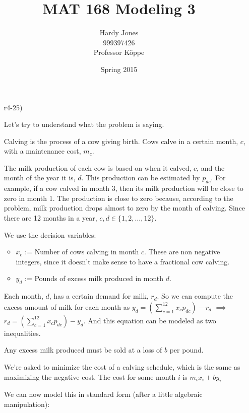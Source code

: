 \documentclass[12pt,letterpaper]{article}
\title{MAT 168 Modeling 3\vspace{-2ex}}
\author{Hardy Jones\\
        999397426\\
        Professor K\"{o}ppe\vspace{-2ex}}
\date{Spring 2015}
\begin{document}
  \maketitle

  \begin{enumerate}
    \item [r4-25)]

      Let's try to understand what the problem is saying.

      Calving is the process of a cow giving birth.
      Cows calve in a certain month, $c$,
      with a maintenance cost, $m_c$.

      The milk production of each cow is based on when it calved, $c$, and the month of the year it is, $d$.
      This production can be estimated by $p_{dc}$.
      For example, if a cow calved in month 3, then its milk production will be close to zero in month 1.
      The production is close to zero because, according to the problem,
      milk production drops almost to zero by the  month of calving.
      Since there are 12 months in a year, $c, d \in \{1, 2, \dots, 12\}$.

      We use the decision variables:

      \begin{itemize}
        \item $x_c$ := Number of cows calving in month $c$. These are non negative integers, since it doesn't make sense to have a fractional cow calving.
        \item $y_d$ := Pounds of excess milk produced in month $d$.
      \end{itemize}

      Each month, $d$, has a certain demand for milk, $r_d$.
      So we can compute the excess amount of milk for each month as
      $y_d = \left(\sum\limits_{c = 1}^{12} x_c p_{dc}\right) - r_d$
      $\implies$
      $r_d = \left(\sum\limits_{c = 1}^{12} x_c p_{dc}\right) - y_d$.
      And this equation can be modeled as two inequalities.

      Any excess milk produced must be sold at a loss of $b$ per pound.

      We're asked to minimize the cost of a calving schedule,
      which is the same as maximizing the negative cost.
      The cost for some month $i$ is $m_i x_i + b y_i$

      We can now model this in standard form (after a little algebraic manipulation):


\end{enumerate}
\end{document}

